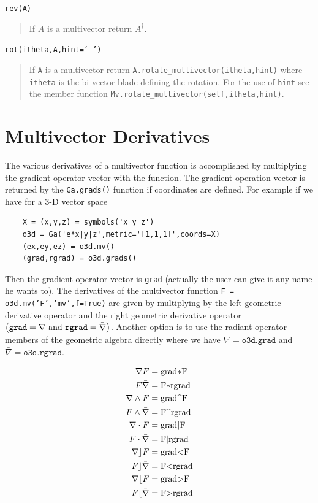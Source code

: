 \documentclass[12pt]{report}
\newcommand{\lp}{\left (}
\newcommand{\rp}{\right )}
\newcommand{\W}{\wedge}
\newcommand{\R}{\dagger}
\newcommand{\paren}[1]{\lp {#1} \rp}
\newcommand{\T}[1]{\texttt{#1}}
\begin{document}
\T{rev(A)}
\begin{quote}
    If $A$ is a multivector return $A^{\R}$.
\end{quote}

\T{rot(itheta,A,hint='-')}
\begin{quote}
    If \T{A} is a multivector return \T{A.rotate\_multivector(itheta,hint)} where \T{itheta} is the bi-vector blade defining the rotation.
    For the use of \T{hint} see the member function \T{Mv.rotate\_multivector(self,itheta,hint)}.

\end{quote}

\section{Multivector Derivatives}

The various derivatives of a multivector function is accomplished by
multiplying the gradient operator vector with the function.  The gradient
operation vector is returned by the \T{Ga.grads()} function if coordinates
are defined.  For example if we have for a 3-D vector space

\begin{lstlisting}
    X = (x,y,z) = symbols('x y z')
    o3d = Ga('e*x|y|z',metric='[1,1,1]',coords=X)
    (ex,ey,ez) = o3d.mv()
    (grad,rgrad) = o3d.grads()
\end{lstlisting}

Then the gradient operator vector is \T{grad} (actually the user can give
it any name he wants to).  The derivatives of the multivector
function \T{F = o3d.mv('F','mv',f=True)} are given by multiplying by the
left geometric derivative operator and the right geometric derivative operator
$\paren{\mbox{\T{grad}} = \nabla\mbox{ and } \mbox{\T{rgrad}} = \bar{\nabla}}$.  Another option
is to use the radiant operator members of the geometric algebra directly where we have
$\nabla = \T{o3d.grad}$ and $\bar{\nabla} = \T{o3d.rgrad}$.

      \begin{align*}
            \nabla F &=  \mbox{\lstinline!grad*F!} \\
            F \bar{\nabla} &=  \mbox{\lstinline!F*rgrad!} \\
            \nabla \W F &=  \mbox{\lstinline!grad^F!} \\
            F \W \bar{\nabla} &=  \mbox{\lstinline!F^rgrad!} \\
            \nabla \cdot F &=  \mbox{\lstinline!grad|F!} \\
            F \cdot \bar{\nabla} &=  \mbox{\lstinline!F|rgrad!} \\
            \nabla \rfloor F &=  \mbox{\lstinline!grad<F!} \\
            F \rfloor \bar{\nabla} &=  \mbox{\lstinline!F<rgrad!} \\
            \nabla \lfloor F &=  \mbox{\lstinline!grad>F!} \\
            F \lfloor \bar{\nabla} &= \mbox{\lstinline!F>rgrad!}
      \end{align*}
\end{document}
